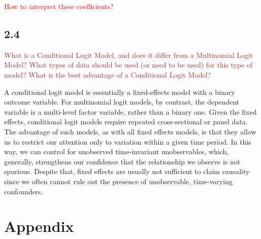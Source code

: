 \documentclass[
]{article}
\begin{document}
\textcolor{red}{How to interpret these coefficients?}

\hypertarget{section-6}{%
\subsection{2.4}\label{section-6}}

\textcolor{brown}{What is a Conditional Logit Model, and does it differ from a Multinomial Logit Model? What types of data should be used (or need to be used) for this type of model? What is the best advantage of a Conditional Logit Model?}

A conditional logit model is essentially a fixed-effects model with a
binary outcome variable. For multinomial logit models, by contrast, the
dependent variable is a multi-level factor variable, rather than a
binary one. Given the fixed effects, conditional logit models require
repeated cross-sectional or panel data. The advantage of such models, as
with all fixed effects models, is that they allow us to restrict our
attention only to variation within a given time period. In this way, we
can control for unobserved time-invariant unobservables, which,
generally, strengthens our confidence that the relationship we observe
is not spurious. Despite that, fixed effects are usually not sufficient
to claim causality since we often cannot rule out the presence of
unobservable, time-varying confounders.

\hypertarget{appendix}{%
\section{Appendix}\label{appendix}}
\end{document}
